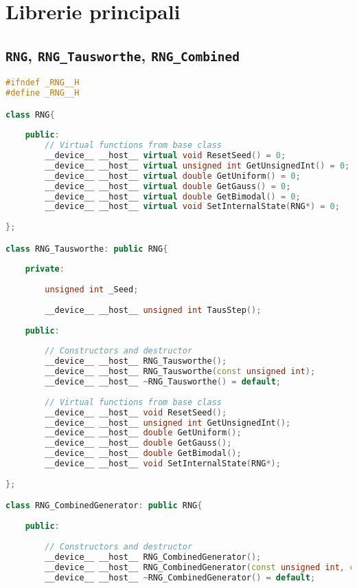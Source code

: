\section{Librerie principali}
\lipsum[1]

\subsection{\texttt{RNG}, \texttt{RNG\_Tausworthe}, \texttt{RNG\_Combined}}
\lipsum[1-3]

\begin{lstlisting}[language=C++, caption={\texttt{libraries/CoreLibraries/RandomGenerator/RNG.cuh}}]
#ifndef _RNG__H
#define _RNG__H

class RNG{
	
	public:
		// Virtual functions from base class
		__device__ __host__ virtual void ResetSeed() = 0;
		__device__ __host__ virtual unsigned int GetUnsignedInt() = 0;
		__device__ __host__ virtual double GetUniform() = 0;
		__device__ __host__ virtual double GetGauss() = 0;
		__device__ __host__ virtual double GetBimodal() = 0;
		__device__ __host__ virtual void SetInternalState(RNG*) = 0;
		
};

class RNG_Tausworthe: public RNG{
	
	private:
		
		unsigned int _Seed;
		
		__device__ __host__ unsigned int TausStep();
	
	public:
	
		// Constructors and destructor
		__device__ __host__ RNG_Tausworthe();
		__device__ __host__ RNG_Tausworthe(const unsigned int);
		__device__ __host__ ~RNG_Tausworthe() = default;	
		
		// Virtual functions from base class
		__device__ __host__ void ResetSeed();
		__device__ __host__ unsigned int GetUnsignedInt();
		__device__ __host__ double GetUniform();
		__device__ __host__ double GetGauss();
		__device__ __host__ double GetBimodal();
		__device__ __host__ void SetInternalState(RNG*);
		
};

class RNG_CombinedGenerator: public RNG{
	
	public:
	
		// Constructors and destructor
		__device__ __host__ RNG_CombinedGenerator();
		__device__ __host__ RNG_CombinedGenerator(const unsigned int, const unsigned int, const unsigned int, const unsigned int);
		__device__ __host__ ~RNG_CombinedGenerator() = default;
		

\end{lstlisting}
